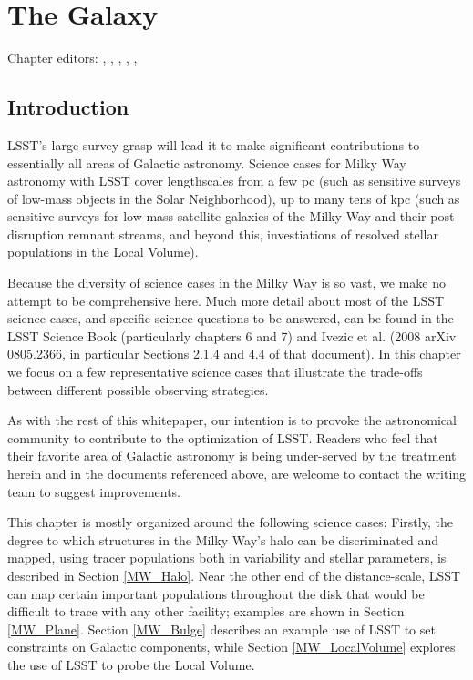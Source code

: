 
\chapter{The Galaxy}
\def\chpname{galaxy}\label{chp:\chpname}

Chapter editors:
,
,
,
,
,



\section{Introduction}
\def\secname{MW_Intro}\label{sec:\secname}

LSST's large survey grasp will lead it to make significant
contributions to essentially all areas of Galactic astronomy. Science
cases for Milky Way astronomy with LSST cover lengthscales from a few
pc (such as sensitive surveys of low-mass objects in the Solar
Neighborhood), up to many tens of kpc (such as sensitive surveys for
low-mass satellite galaxies of the Milky Way and their post-disruption
remnant streams, and beyond this, investiations of resolved stellar
populations in the Local Volume).

Because the diversity of science cases in the Milky Way is so vast, we
make no attempt to be comprehensive here. Much more detail about most
of the LSST science cases, and specific science questions to be
answered, can be found in the LSST Science Book (particularly chapters
6 and 7) and Ivezic et al. (2008 arXiv 0805.2366, in particular
Sections 2.1.4 and 4.4 of that document). In this chapter we focus on
a few representative science cases that illustrate the trade-offs
between different possible observing strategies.

As with the rest of this whitepaper, our intention is to provoke the
astronomical community to contribute to the optimization of
LSST. Readers who feel that their favorite area of Galactic astronomy
is being under-served by the treatment herein and in the documents
referenced above, are welcome to contact the writing team to suggest
improvements. 

This chapter is mostly organized around the following science cases:
Firstly, the degree to which structures in the Milky Way's halo can be
discriminated and mapped, using tracer populations both in variability
and stellar parameters, is described in Section \ref{MW_Halo}. Near
the other end of the distance-scale, LSST can map certain important
populations throughout the disk that would be difficult to trace with
any other facility; examples are shown in Section
\ref{MW_Plane}.  Section
\ref{MW_Bulge} describes an example use of LSST to set constraints on
Galactic components, while Section \ref{MW_LocalVolume} explores the
use of LSST to probe the Local Volume.

